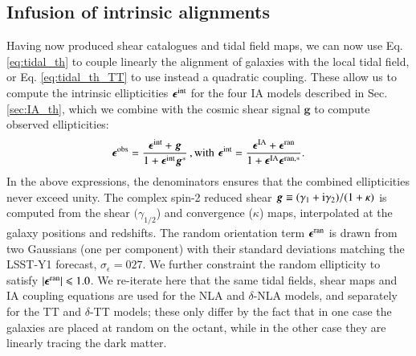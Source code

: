 \documentclass[useAMS,usenatbib]{mn2e}
\begin{document}
\subsection{Infusion of intrinsic alignments}


Having now produced shear catalogues and tidal field maps, we can now use Eq. \ref{eq:tidal_th} to couple linearly the alignment of galaxies with the local tidal field, or Eq. \ref{eq:tidal_th_TT} to use instead a quadratic coupling. These allow us to compute the intrinsic ellipticities ${\boldsymbol \epsilon}^{\rm int}$ for the four IA models described in Sec. \ref{sec:IA_th}, which we combine with the cosmic shear signal ${\boldsymbol g}$ to compute observed ellipticities: 
\begin{eqnarray}
{\boldsymbol \epsilon}^{\rm obs} = \frac{{\boldsymbol \epsilon}^{\rm int} + {\boldsymbol g}}{1 + {\boldsymbol \epsilon}^{\rm int}{\boldsymbol g^*}} \,, {\rm with \, \, } 
{\boldsymbol \epsilon}^{\rm int}  = \frac{{\boldsymbol \epsilon}^{\rm IA} + {\boldsymbol \epsilon}^{\rm ran}}{1 + {\boldsymbol \epsilon}^{\rm IA}{\boldsymbol \epsilon^{\rm ran, *}}}.
\label{eq:eps_obs}
\end{eqnarray}
In the above expressions, the denominators ensures that the combined  ellipticities never exceed unity.
The complex spin-2 reduced shear ${\boldsymbol g} \equiv (\gamma_1 + {\rm i} \gamma_2)/(1+\kappa)$ is computed from the shear  $(\gamma_{1/2}$) and convergence ($\kappa$) maps, interpolated at the galaxy positions and redshifts. The  random orientation term ${\boldsymbol \epsilon}^{\rm ran}$ is drawn from two Gaussians (one per component) with their standard deviations matching the LSST-Y1 forecast, $\sigma_{\epsilon} = 027$. We further constraint  the random ellipticity to satisfy $|{\boldsymbol \epsilon}^{\rm ran}| \le 1.0$. 
We re-iterate here that the same tidal fields, shear maps and IA coupling equations are used for the NLA and $\delta$-NLA models, and separately for the TT and $\delta$-TT models; these  only differ by the fact that in one case the galaxies are placed at random on the octant, while in the other case they are linearly tracing the dark matter.
\end{document}
